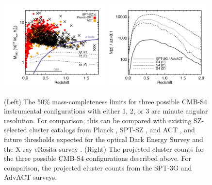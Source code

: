 \begin{figure}[t]
\begin{center}
\includegraphics[width=0.49\textwidth]{DarkEnergy/mass_vs_z_s4.pdf}
\includegraphics[width=0.49\textwidth]{DarkEnergy/dndz_s4.pdf}
\caption{(Left) The 50\% mass-completeness limits for three possible CMB-S4 instrumental configurations with either 1, 2, or 3 arc minute angular resolution.  For comparison, this can be compared with existing SZ-selected cluster catalogs from Planck \cite{planck15-32}, SPT-SZ \cite{bleem15b}, and ACT \cite{hasselfield13}, and future thresholds expected for the optical Dark Energy Survey and the X-ray eRosita survey \cite{pillepich12}.  (Right) The projected cluster counts for the three possible CMB-S4 configurations described above.  For comparison, the projected cluster counts from the SPT-3G \cite{benson14} and AdvACT surveys.}
\label{fig:cluster_counts}
\end{center}
\end{figure} 


